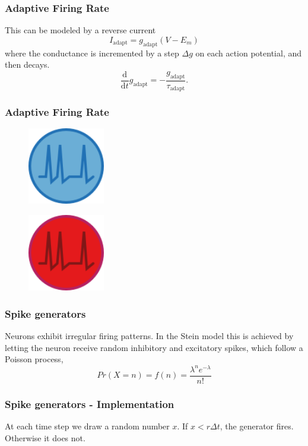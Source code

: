 \documentclass{beamer}
\begin{document}
\begin{frame}
	\frametitle{Adaptive Firing Rate}
	This can be modeled by a reverse current
	$$
 I_{\mathrm{adapt}} =  g_{\mathrm{adapt}}(V - E_m)
$$
where the conductance is incremented by a step $\Delta g$ on each action potential, and then decays.
$$
\frac{\mathrm{d}}{\mathrm{d}t} g_{\mathrm{adapt}}=-\frac{g_{\mathrm{adapt}}}{\tau_{\mathrm{adapt}}}.
$$
\end{frame}

\begin{frame}
	\frametitle{Adaptive Firing Rate}
	\begin{figure}
		\includegraphics[width = 0.3\textwidth]{figures/adaptive.png}
	\end{figure}
		\begin{figure}
	\includegraphics[width =0.3\textwidth]{figures/adaptive_inhibitory.png}
		\end{figure}
\end{frame}


\begin{frame}
	\frametitle{Spike generators}
	Neurons exhibit irregular firing patterns. In the Stein model this is achieved by letting the neuron receive random inhibitory and excitatory spikes, which follow a Poisson process, 
	  $$
	   Pr(X=n) = f(n) =  \frac{\lambda^n e^{-\lambda }}{n!}
	  $$
\end{frame}

\begin{frame}
	\frametitle{Spike generators - Implementation}
	At each time step we draw a random number $x$. If $x<r\Delta t$, the generator fires. Otherwise it does not. 
\end{frame}
\end{document}
